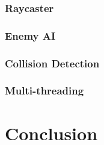 \documentclass{article}
\begin{document}
\subsubsection{Raycaster}

\subsubsection{Enemy AI}

\subsubsection{Collision Detection}

\subsubsection{Multi-threading}

\section{Conclusion}
\end{document}
